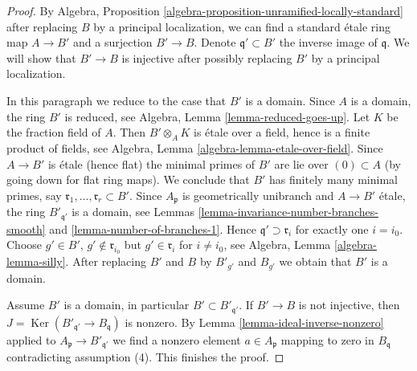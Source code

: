 \documentclass[10pt,a4paper]{amsart}
\theoremstyle{plain}
\theoremstyle{definition}
\theoremstyle{remark}
\numberwithin{equation}{subsection}
\def\Ker{\mathop{\mathrm{Ker}}}
\begin{document}
\begin{proof}
By Algebra, Proposition \ref{algebra-proposition-unramified-locally-standard}
after replacing $B$ by a principal localization, we can find a
standard \'etale ring map $A \to B'$ and a surjection $B' \to B$.
Denote $\mathfrak q' \subset B'$ the inverse image of $\mathfrak q$.
We will show that $B' \to B$ is injective
after possibly replacing $B'$ by a principal localization.

\medskip\noindent
In this paragraph we reduce to the case that $B'$ is a domain.
Since $A$ is a domain, the ring $B'$ is reduced, see
Algebra, Lemma \ref{lemma-reduced-goes-up}.
Let $K$ be the fraction field of $A$. Then $B' \otimes_A K$
is \'etale over a field, hence is a finite product of fields, see
Algebra, Lemma \ref{algebra-lemma-etale-over-field}.
Since $A \to B'$ is \'etale (hence flat) the minimal primes of $B'$
are lie over $(0) \subset A$ (by going down for flat ring maps).
We conclude that $B'$ has finitely many minimal primes, say
$\mathfrak r_1, \ldots, \mathfrak r_r \subset B'$.
Since $A_\mathfrak p$ is geometrically unibranch and $A \to B'$ \'etale,
the ring $B'_{\mathfrak q'}$ is a domain, see
Lemmas \ref{lemma-invariance-number-branches-smooth} and
\ref{lemma-number-of-branches-1}.
Hence $\mathfrak q' \supset \mathfrak r_i$ for exactly one $i = i_0$.
Choose $g' \in B'$, $g' \not \in \mathfrak r_{i_0}$ but
$g' \in \mathfrak r_i$ for $i \not = i_0$, see
Algebra, Lemma \ref{algebra-lemma-silly}. After replacing
$B'$ and $B$ by $B'_{g'}$ and $B_{g'}$ we obtain that $B'$
is a domain.

\medskip\noindent
Assume $B'$ is a domain, in particular $B' \subset B'_{\mathfrak q'}$.
If $B' \to B$ is not injective,
then $J = \Ker(B'_{\mathfrak q'} \to B_\mathfrak q)$ is nonzero.
By Lemma \ref{lemma-ideal-inverse-nonzero} applied to
$A_\mathfrak p \to B'_{\mathfrak q'}$
we find a nonzero element $a \in A_\mathfrak p$
mapping to zero in $B_\mathfrak q$ contradicting
assumption (4). This finishes the proof.
\end{proof}
\end{document}
